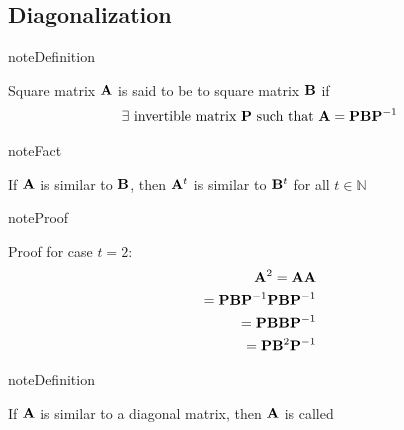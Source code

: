 \documentclass[letterpaper,10pt,english]{jupyterBook}
\begin{document}
\subsection{Diagonalization}
\label{\detokenize{05.linear_algebra:diagonalization}}
\begin{sphinxadmonition}{note}{Definition}

\sphinxAtStartPar
Square matrix \({\bf A}\) is said to be  to square matrix \({\bf B}\) if
\begin{equation*}
\begin{split}
%
\exists \text{ invertible matrix ${\bf P}$ such that }
{\bf A} = {\bf P} {\bf B} {\bf P}^{-1}
%
\end{split}
\end{equation*}\end{sphinxadmonition}

\begin{figure}[htbp]
\centering

\noindent{}
\end{figure}

\begin{sphinxadmonition}{note}{Fact}

\sphinxAtStartPar
If \({\bf A}\) is similar to \({\bf B}\), then \({\bf A}^t\) is similar to
\({\bf B}^t\) for all \(t \in \mathbb{N}\)
\end{sphinxadmonition}

\begin{sphinxadmonition}{note}{Proof}

\sphinxAtStartPar
Proof for case \(t=2\):
\begin{equation*}
\begin{split}
%
{\bf A}^2
= {\bf A} {\bf A} \\
= {\bf P} {\bf B} {\bf P}^{-1} {\bf P} {\bf B} {\bf P}^{-1} \\
= {\bf P} {\bf B} {\bf B} {\bf P}^{-1} \\
= {\bf P} {\bf B}^2 {\bf P}^{-1} 
%
\end{split}
\end{equation*}\end{sphinxadmonition}

\begin{sphinxadmonition}{note}{Definition}

\sphinxAtStartPar
If \({\bf A}\) is similar to a diagonal matrix, then \({\bf A}\) is
called 
\end{sphinxadmonition}
\end{document}
